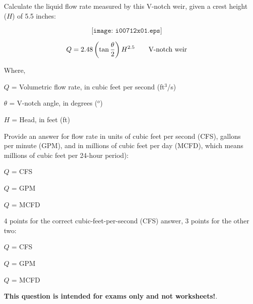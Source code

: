 

Calculate the liquid flow rate measured by this V-notch weir, given a crest height ($H$) of 5.5 inches:

$$\texttt{[image: i00712x01.eps]}$$

$$Q = 2.48 \left( \tan {\theta \over 2} \right) H^{2.5} \hbox{\hskip 20pt V-notch weir}$$

\noindent
Where,

$Q$ = Volumetric flow rate, in cubic feet per second (ft$^{3}$/s)

$\theta$ = V-notch angle, in degrees ($^{o}$)

$H$ = Head, in feet (ft)

\vskip 10pt

Provide an answer for flow rate in units of cubic feet per second (CFS), gallons per minute (GPM), and in millions of cubic feet per day (MCFD), which means millions of cubic feet per 24-hour period):

\vskip 10pt

$Q$ = \underbar{\hskip 50pt} CFS

\vskip 10pt

$Q$ = \underbar{\hskip 50pt} GPM

\vskip 10pt

$Q$ = \underbar{\hskip 50pt} MCFD







4 points for the correct cubic-feet-per-second (CFS) answer, 3 points for the other two:

\vskip 10pt

$Q$ =  CFS

\vskip 10pt

$Q$ =  GPM

\vskip 10pt

$Q$ =  MCFD








{\bf This question is intended for exams only and not worksheets!}.



